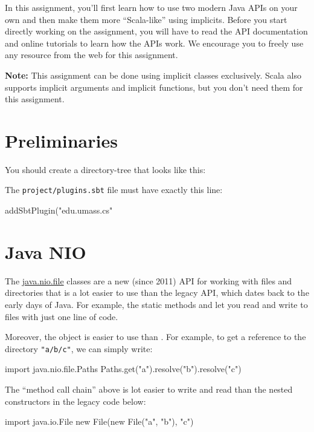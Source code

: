 
In this assignment, you'll first learn how to use two modern Java APIs on your own and then make them more ``Scala-like'' using implicits. Before you start directly working on the assignment, you will have to read the API documentation and online tutorials to learn how the APIs work. We encourage you to freely use any resource from the web for this assignment.

\textbf{Note:} This assignment can be done using implicit classes exclusively. Scala also supports implicit arguments and implicit functions, but you don't need them for this assignment.

\section{Preliminaries}

You should create a directory-tree that looks like this:


The \texttt{project/plugins.sbt} file must have exactly this line:

\begin{scalacode}
addSbtPlugin("edu.umass.cs" %
\end{scalacode}

\section{Java NIO}

The \href{https://docs.oracle.com/javase/7/docs/api/java/nio/file/package-summary.html#package_description}{java.nio.file} classes are a new (since 2011) API for working with files and directories that is a lot easier to use than the legacy API, which dates back to the early days of Java. For example, the static methods  and  let you read and write to files with just one line of code.

Moreover, the  object is easier to use than . For example, to get a reference to the directory \texttt{"a/b/c"}, we can simply write:
%
\begin{scalacode}
import java.nio.file.Paths
Paths.get("a").resolve("b").resolve("c")
\end{scalacode}
%
The ``method call chain'' above is lot easier to write and read than the nested constructors in the legacy code below:
%
\begin{scalacode}
import java.io.File
new File(new File("a", "b"), "c")
\end{scalacode}

